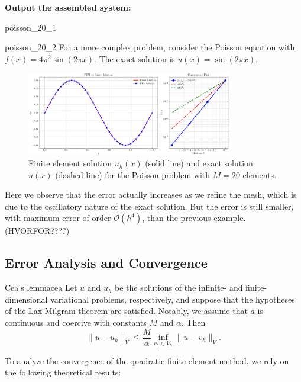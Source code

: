 \documentclass[a4paper,10pt]{article}
\begin{document}
\begin{algorithm}[H]
{	\BlankLine
	}
	\BlankLine

	\textbf{Output the assembled system:}\\

\end{algorithm}

\begin{example}{}{poisson_20_1}

\end{example}

\begin{example}{}{poisson_20_2}
	For a more complex problem, consider the Poisson equation with \(f(x) = 4\pi^2\sin(2\pi x)\).
	The exact solution is \(u(x) = \sin(2\pi x)\).
	\begin{figure}[H]
		\centering
		\includegraphics[width=0.8\textwidth]{figures/fem_solution_20_2.png}
		\caption{Finite element solution \(u_h(x)\) (solid line) and exact solution \(u(x)\) (dashed line) for the Poisson problem with \(M=20\) elements.}
	\end{figure}
	Here we observe that the error actually increases as we refine the mesh, which is due to the oscillatory nature of the exact solution.
	But the error is still smaller, with maximum error of order \(\mathcal{O}(h^4)\), than the previous example. (HVORFOR????)
\end{example}

\subsection{Error Analysis and Convergence}
\begin{lemma}{Cea's lemma}{cea}
	Let \(u\) and \(u_h\) be the solutions of the infinite- and finite-dimensional variational problems, respectively, and suppose that the hypotheses of the Lax-Milgram theorem are satisfied. Notably, we assume that \(a\) is continuous and coercive with constants \(M\) and \(\alpha\). Then
	\[
		\|u - u_h\|_V \leq \frac{M}{\alpha} \inf_{v_h \in V_h} \|u - v_h\|_V.
	\]
\end{lemma}
To analyze the convergence of the quadratic finite element method, we rely on the following theoretical results:
\end{document}
